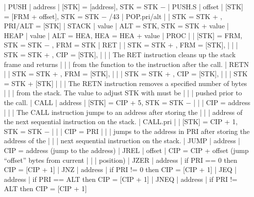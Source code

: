 {    | PUSH           | address | [STK] = [address], STK = STK $-$ \cellsize \nl
{}    | PUSH.S         | offset  | [STK] = [FRM + offset], STK = STK $-$ \cellsize \nl
{}/43 | POP.pri/alt    |         | STK = STK + \cellsize, PRI/ALT = [STK] \nl
{}    | STACK          | value   | ALT = STK, STK = STK + value \nl
{}    | HEAP           | value   | ALT = HEA, HEA = HEA + value \nl
{}    | PROC           |         | [STK] = FRM, STK = STK $-$ \cellsize, FRM = STK \nl
{}    | RET            |         | STK = STK + \cellsize, FRM = [STK], \nlnorule
\!       |                |         | STK = STK + \cellsize, CIP = [STK], \nlnorule
\!       |                |         | The RET instruction cleans up the stack frame and returns \nlnorule
\!       |                |         | from the function to the instruction after the call. \nl
{}    | RETN           |         | STK = STK + \cellsize, FRM = [STK], \nlnorule
\!       |                |         | STK = STK + \cellsize, CIP = [STK], \nlnorule
\!       |                |         | STK = STK + [STK] \nlnorule
\!       |                |         | The RETN instruction removes a specified number of bytes \nlnorule
\!       |                |         | from the stack. The value to adjust STK with must be \nlnorule
\!       |                |         | pushed prior to the call. \nl
{}    | CALL           | address | [STK] = CIP + 5, STK = STK $-$ \cellsize \nlnorule
\!       |                |         | CIP = address \nlnorule
\!       |                |         | The CALL instruction jumps to an address after storing the \nlnorule
\!       |                |         | address of the next sequential instruction on the stack. \nl
{}    | CALL.pri       |         | [STK] = CIP + 1, STK = STK $-$ \cellsize \nlnorule
\!       |                |         | CIP = PRI \nlnorule
\!       |                |         | jumps to the address in PRI after storing the address of the \nlnorule
\!       |                |         | next sequential instruction on the stack. \nl
{}    | JUMP           | address | CIP = address (jump to the address) \nl
{}    | JREL           | offset  | CIP = CIP + offset (jump ``offset'' bytes from current \nlnorule
\!       |                |         | position) \nl
{}    | JZER           | address | if PRI == 0 then CIP = [CIP + 1]  \nl
{}    | JNZ            | address | if PRI != 0 then CIP = [CIP + 1]  \nl
{}    | JEQ            | address | if PRI == ALT then CIP = [CIP + 1] \nl
{}    | JNEQ           | address | if PRI != ALT then CIP = [CIP + 1] \nl
}
